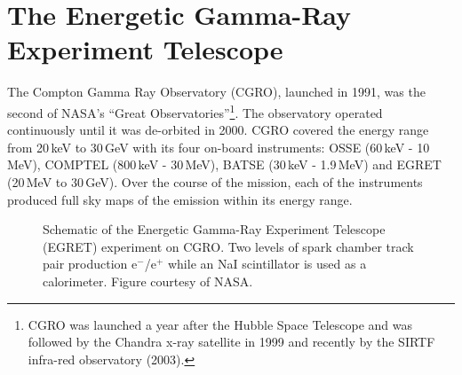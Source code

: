 \section{The Energetic Gamma-Ray Experiment Telescope}
\label{SEC::INTRODUCTION::EGRET}

The Compton Gamma Ray Observatory (CGRO), launched in 1991, was the
second of NASA's ``Great Observatories''\footnote{CGRO was launched a
year after the Hubble Space Telescope and was followed by the Chandra
x-ray satellite in 1999 and recently by the SIRTF infra-red
observatory (2003).}. The observatory operated continuously until it
was de-orbited in 2000. CGRO covered the energy range from 20\,keV to
30\,GeV with its four on-board instruments: OSSE (60\,keV - 10\,MeV),
COMPTEL (800\,keV - 30\,MeV), BATSE (30\,keV - 1.9\,MeV) and EGRET
(20\,MeV to 30\,GeV). Over the course of the mission, each of the
instruments produced full sky maps of the \Gray emission within its
energy range.

\begin{figure}[t]
\caption{\label{FIG::INTRODUCTION::EGRET}Schematic of the Energetic Gamma-Ray 
Experiment Telescope (EGRET) experiment on CGRO. Two levels of spark chamber
track pair production e$^-$/e$^+$ while an NaI scintillator is used as a
calorimeter. Figure courtesy of NASA.}
\end{figure}

